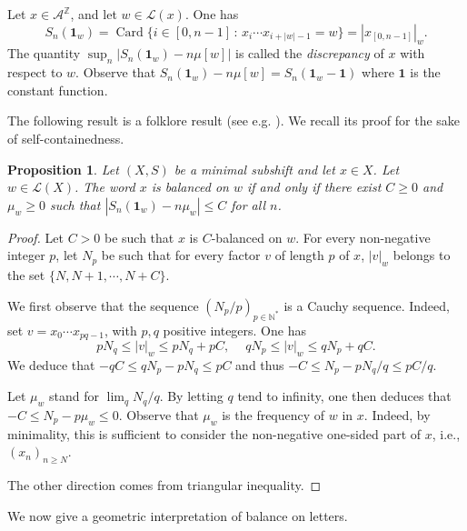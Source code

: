 \documentclass{article}
\newtheorem{proposition}[lemma]{Proposition}
\theoremstyle{definition}
\DeclareMathOperator{\Card}{Card}
\begin{document}
 
Let  $x \in \mathcal{A}^{\mathbb{Z}}$, and let $ w \in {\mathcal L} (x)$. One has 
$$S_n({\mathbf 1}_w)=\Card \bigl\{ i \in [0, n-1]  \,: \,  x_i \cdots x_{i+|w|-1}= w \bigr\} =  |x_{[0,n-1]}|_w .$$
The quantity  $ \sup_n |S_n({\mathbf 1}_w) - n \mu[w]|$ is called the {\em discrepancy} of $x$ with respect to $w$. Observe that $S_n({\mathbf 1}_w) - n \mu[w]=S_n({\mathbf 1}_w- {\mathbf 1})$ where ${\mathbf1}$ is the constant function.

The following result is a folklore result (see e.g. \cite{BerTij:2002}).  We recall its proof for the sake of self-containedness.

\begin{proposition}\label{prop:disc}
Let $(X,S)$ be a minimal subshift and let $x \in X$. Let $ w \in {\mathcal L} (X)$.
 The word $x$ is balanced on $w$ if and only if there exist $C\geq 0$ and $  \mu_w  \geq 0$ such that 
 $|S_n({\mathbf 1}_w) - n \mu_w| \leq C$ for all $n$.
\end{proposition}
\begin{proof}

Let $C>0$ be  such that $x$ is $C$-balanced  on  $w$. 
For every non-negative integer $p$, let $N_p$ be    such that
for every factor $v$  of length $p$ of $x$,  $|v|_w$ 
 belongs to the set $\{N,N+1,\cdots, N+C\}$.
 
We first observe that the sequence $(N_p/p)_{p \in {\mathbb N^*}}$ is a Cauchy sequence.
Indeed, set $v = x_0 \cdots x_{pq-1}$, with $p,q$ positive integers.
One has
\[
p N_q \leq |v|_w \leq p N_q + p C, \ \quad q N_p \leq |v|_w \leq q N_p + q C.
\]
We deduce that $-q C \leq q N_p -p N_q \leq p C$ and thus $-C \leq N_p - p N_q /q \leq p C / q$.
 
Let $\mu_w$ stand for $\lim_q N_q/q$. By letting $q$ tend to infinity, one then deduces that 
$-C \leq N_p -p \mu_w \leq 0$. Observe that $\mu_w$ is the frequency of $w$ in $x$. Indeed, by minimality, this is sufficient to consider   the non-negative one-sided part of $x$,
i.e., $(x_n)_{n \geq N}$.

The other direction   comes from triangular inequality.
\end{proof}
We now give  a geometric interpretation of balance on letters.
\end{document}
